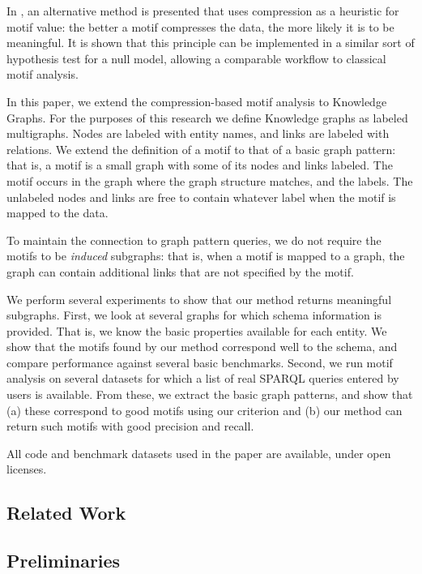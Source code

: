 \documentclass[11pt]{article}
\begin{document}
In \cite{bloem2017large}, an alternative method is presented that uses compression as a heuristic for motif value: the better a motif compresses the data, the more likely it is to be meaningful. It is shown that this principle can be implemented in a similar sort of hypothesis test for a null model, allowing a comparable workflow to classical motif analysis. 

In this paper, we extend the compression-based motif analysis to Knowledge Graphs. For the purposes of this research we define Knowledge graphs as labeled multigraphs. Nodes are labeled with entity names, and links are labeled with relations. We extend the definition of a motif to that of a basic graph pattern: that is, a motif is a small graph with some of its nodes and links labeled. The motif occurs in the graph where the graph structure matches, and the labels. The unlabeled nodes and links are free to contain whatever label when the motif is mapped to the data.

To maintain the connection to graph pattern queries, we do not require the motifs to be \emph{induced} subgraphs: that is, when a motif is mapped to a graph, the graph can contain additional links that are not specified by the motif. 

We perform several experiments to show that our method returns meaningful subgraphs. First, we look at several graphs for which schema information is provided. That is, we know the basic properties available for each entity. We show that the motifs found by our method correspond well to the schema, and compare performance against several basic benchmarks. Second, we run motif analysis on several datasets for which a list of real SPARQL queries entered by users is available. From these, we extract the basic graph patterns, and show that (a) these correspond to good motifs using our criterion and (b) our method can return such motifs with good precision and recall.

All code and benchmark datasets used in the paper are available, under open licenses.\footnotemark



\subsection{Related Work}

\subsection{Preliminaries}
\end{document}

